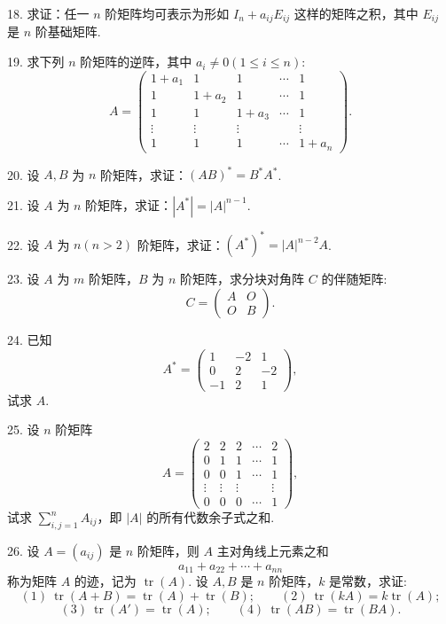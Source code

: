 \documentclass[UTF8, 12pt, fontset=fandol, oneside]{ctexart}
\begin{document}
18. 求证：任一 $n$ 阶矩阵均可表示为形如 $I_n+a_{ij}E_{ij}$ 这样的矩阵之积，其中 $E_{ij}$ 是 $n$ 阶基础矩阵.

19. 求下列 $n$ 阶矩阵的逆阵，其中 $a_i\neq 0(1\leq i\leq n)$:
\[
A=\left(\begin{array}{ccccc}
1+a_1 & 1 & 1 & \cdots & 1\\
1 & 1+a_2 & 1 & \cdots & 1\\
1 & 1 & 1+a_3 & \cdots & 1\\
\vdots & \vdots & \vdots & & \vdots\\
1 & 1 & 1 & \cdots & 1+a_n
\end{array}\right).
\]

20. 设 $A,B$ 为 $n$ 阶矩阵，求证：$(AB)^*=B^*A^*$.

21. 设 $A$ 为 $n$ 阶矩阵，求证：$|A^*|=|A|^{n-1}$.

22. 设 $A$ 为 $n(n>2)$ 阶矩阵，求证：$(A^*)^*=|A|^{n-2}A$.

23. 设 $A$ 为 $m$ 阶矩阵，$B$ 为 $n$ 阶矩阵，求分块对角阵 $C$ 的伴随矩阵:
\[
C=\left(\begin{array}{cc}
A & O\\
O & B
\end{array}\right).
\]

24. 已知
\[
A^*=\left(\begin{array}{ccc}
1 & -2 & 1\\
0 & 2 & -2\\
-1 & 2 & 1
\end{array}\right),
\]
试求 $A$.

25. 设 $n$ 阶矩阵
\[
A=\left(\begin{array}{ccccc}
2 & 2 & 2 & \cdots & 2\\
0 & 1 & 1 & \cdots & 1\\
0 & 0 & 1 & \cdots & 1\\
\vdots & \vdots & \vdots & & \vdots\\
0 & 0 & 0 & \cdots & 1
\end{array}\right),
\]
试求 $\sum\limits_{i,j=1}^n A_{ij}$，即 $|A|$ 的所有代数余子式之和.

26. 设 $A=(a_{ij})$ 是 $n$ 阶矩阵，则 $A$ 主对角线上元素之和
\[
a_{11}+a_{22}+\cdots+a_{nn}
\]
称为矩阵 $A$ 的迹，记为 $\operatorname{tr}(A)$. 设 $A,B$ 是 $n$ 阶矩阵，$k$ 是常数，求证:
\[
(1)\ \operatorname{tr}(A+B)=\operatorname{tr}(A)+\operatorname{tr}(B);\qquad
(2)\ \operatorname{tr}(kA)=k\operatorname{tr}(A);
\]
\[
(3)\ \operatorname{tr}(A')=\operatorname{tr}(A);\qquad
(4)\ \operatorname{tr}(AB)=\operatorname{tr}(BA).
\]
\end{document}
